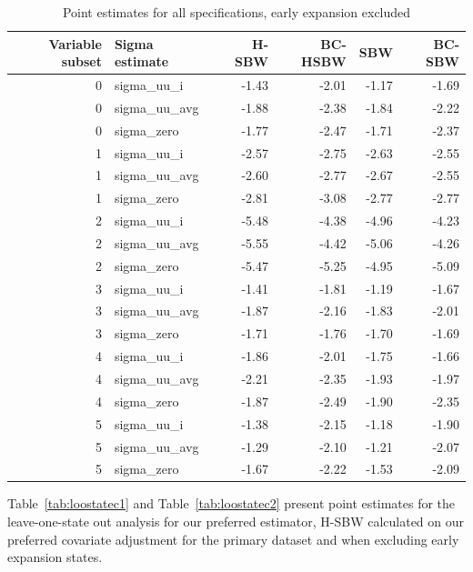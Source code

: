 \documentclass[aoas]{imsart}
\theoremstyle{plain}
\theoremstyle{remark}
\begin{document}
\begin{appendix}
\begin{table}[ht]
\centering
   \caption{Point estimates for all specifications, early expansion excluded}
    \label{tab:secondaryptests}
\begin{tabular}{rlrrrr}
  \hline
Variable subset & Sigma estimate & H-SBW & BC-HSBW & SBW & BC-SBW \\ 
  \hline
0 & sigma\_uu\_i & -1.43 & -2.01 & -1.17 & -1.69 \\ 
  0 & sigma\_uu\_avg & -1.88 & -2.38 & -1.84 & -2.22 \\ 
  0 & sigma\_zero & -1.77 & -2.47 & -1.71 & -2.37 \\ 
  1 & sigma\_uu\_i & -2.57 & -2.75 & -2.63 & -2.55 \\ 
  1 & sigma\_uu\_avg & -2.60 & -2.77 & -2.67 & -2.55 \\ 
  1 & sigma\_zero & -2.81 & -3.08 & -2.77 & -2.77 \\ 
  2 & sigma\_uu\_i & -5.48 & -4.38 & -4.96 & -4.23 \\ 
  2 & sigma\_uu\_avg & -5.55 & -4.42 & -5.06 & -4.26 \\ 
  2 & sigma\_zero & -5.47 & -5.25 & -4.95 & -5.09 \\ 
  3 & sigma\_uu\_i & -1.41 & -1.81 & -1.19 & -1.67 \\ 
  3 & sigma\_uu\_avg & -1.87 & -2.16 & -1.83 & -2.01 \\ 
  3 & sigma\_zero & -1.71 & -1.76 & -1.70 & -1.69 \\ 
  4 & sigma\_uu\_i & -1.86 & -2.01 & -1.75 & -1.66 \\ 
  4 & sigma\_uu\_avg & -2.21 & -2.35 & -1.93 & -1.97 \\ 
  4 & sigma\_zero & -1.87 & -2.49 & -1.90 & -2.35 \\ 
  5 & sigma\_uu\_i & -1.38 & -2.15 & -1.18 & -1.90 \\ 
  5 & sigma\_uu\_avg & -1.29 & -2.10 & -1.21 & -2.07 \\ 
  5 & sigma\_zero & -1.67 & -2.22 & -1.53 & -2.09 \\ 
   \hline
\end{tabular}
\end{table}

Table~\ref{tab:loostatec1} and Table~\ref{tab:loostatec2} present point estimates for the leave-one-state out analysis for our preferred estimator, H-SBW calculated on our preferred covariate adjustment for the primary dataset and when excluding early expansion states.


\end{appendix}
\end{document}
